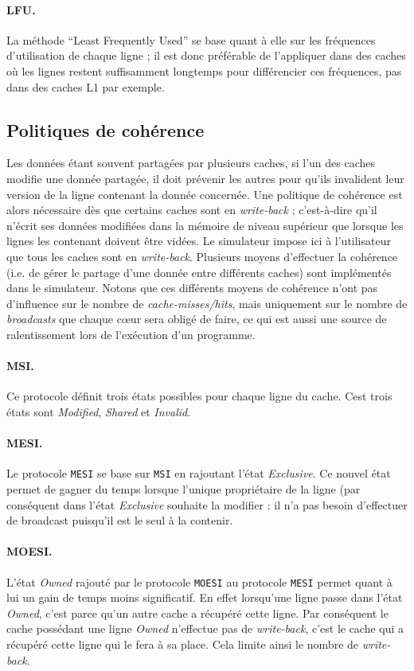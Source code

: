 \paragraph{LFU.}La méthode ``Least Frequently Used'' se base quant à elle sur les fréquences d'utilisation de chaque ligne ; il est donc préférable de l'appliquer dans des caches où les lignes restent suffisamment longtemps pour différencier ces fréquences, pas dans des caches L1 par exemple. 

\subsection{Politiques de cohérence}
\label{coher}

Les données étant souvent partagées par plusieurs caches, si l'un des caches modifie une donnée partagée, il doit prévenir les autres pour qu'ils invalident leur version de la ligne contenant la donnée concernée. Une politique de cohérence est alors nécessaire dès que certains caches sont en \emph{write-back} ; c'est-à-dire qu'il n'écrit ses données modifiées dans la mémoire de niveau supérieur que lorsque les lignes les contenant doivent être vidées. Le simulateur impose ici à l'utilisateur que tous les caches sont en \emph{write-back}. Plusieurs moyens d'effectuer la cohérence (i.e. de gérer le partage d'une donnée entre différents caches) sont implémentés dans le simulateur. Notons que ces différents moyens de cohérence n'ont pas d'influence sur le nombre de \emph{cache-misses/hits}, mais uniquement sur le nombre de \emph{broadcasts} que chaque c\oe ur sera obligé de faire, ce qui est aussi une source de ralentissement lors de l'exécution d'un programme. 

\paragraph{MSI.} Ce protocole définit trois états possibles pour chaque ligne du cache. Cest trois états sont \emph{Modified}, \emph{Shared} et \emph{Invalid}.

\paragraph{MESI.} Le protocole \texttt{MESI} se base sur \texttt{MSI} en rajoutant l'état \emph{Exclusive}. Ce nouvel état permet de gagner du temps lorsque l'unique propriétaire de la ligne (par conséquent dans l'état \emph{Exclusive} souhaite la modifier : il n'a pas besoin d'effectuer de broadcast puisqu'il est le seul à la contenir.

\paragraph{MOESI.} L'état \emph{Owned} rajouté par le protocole \texttt{MOESI} au protocole \texttt{MESI} permet quant à lui un gain de temps moins significatif. En effet lorsqu'une ligne passe dans l'état \emph{Owned}, c'est parce qu'un autre cache a récupéré cette ligne. Par conséquent le cache possédant une ligne \emph{Owned} n'effectue pas de \emph{write-back}, c'est le cache qui a récupéré cette ligne qui le fera à sa place. Cela limite ainsi le nombre de \emph{write-back}.

